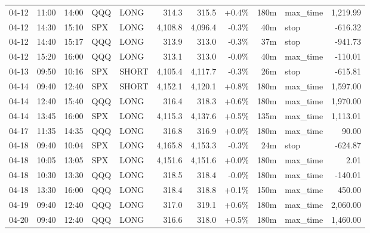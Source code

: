 \documentclass[11pt,a4paper,twoside]{article}
\begin{document}
\begin{center}
\begin{longtable}{>{\color{txtmain}}l l l l l r r r r >{\color{txtmain}}l r}
04-12 & 11:00 & 14:00 & QQQ & LONG & 314.3 & 315.5 & \textcolor{wingreen}{+0.4\%} & 180m & max\_time & \textcolor{wingreen}{1,219.99} \\
04-12 & 14:30 & 15:10 & SPX & LONG & 4,108.8 & 4,096.4 & \textcolor{lossred}{-0.3\%} & 40m & stop & \textcolor{lossred}{-616.32} \\
04-12 & 14:40 & 15:17 & QQQ & LONG & 313.9 & 313.0 & \textcolor{lossred}{-0.3\%} & 37m & stop & \textcolor{lossred}{-941.73} \\
04-12 & 15:20 & 16:00 & QQQ & LONG & 313.1 & 313.0 & \textcolor{lossred}{-0.0\%} & 40m & max\_time & \textcolor{lossred}{-110.01} \\
04-13 & 09:50 & 10:16 & SPX & SHORT & 4,105.4 & 4,117.7 & \textcolor{lossred}{-0.3\%} & 26m & stop & \textcolor{lossred}{-615.81} \\
04-14 & 09:40 & 12:40 & SPX & SHORT & 4,152.1 & 4,120.1 & \textcolor{wingreen}{+0.8\%} & 180m & max\_time & \textcolor{wingreen}{1,597.00} \\
04-14 & 12:40 & 15:40 & QQQ & LONG & 316.4 & 318.3 & \textcolor{wingreen}{+0.6\%} & 180m & max\_time & \textcolor{wingreen}{1,970.00} \\
04-14 & 13:45 & 16:00 & SPX & LONG & 4,115.3 & 4,137.6 & \textcolor{wingreen}{+0.5\%} & 135m & max\_time & \textcolor{wingreen}{1,113.01} \\
04-17 & 11:35 & 14:35 & QQQ & LONG & 316.8 & 316.9 & \textcolor{wingreen}{+0.0\%} & 180m & max\_time & \textcolor{wingreen}{90.00} \\
04-18 & 09:40 & 10:04 & SPX & LONG & 4,165.8 & 4,153.3 & \textcolor{lossred}{-0.3\%} & 24m & stop & \textcolor{lossred}{-624.87} \\
04-18 & 10:05 & 13:05 & SPX & LONG & 4,151.6 & 4,151.6 & \textcolor{wingreen}{+0.0\%} & 180m & max\_time & \textcolor{wingreen}{2.01} \\
04-18 & 10:30 & 13:30 & QQQ & LONG & 318.5 & 318.4 & \textcolor{lossred}{-0.0\%} & 180m & max\_time & \textcolor{lossred}{-140.01} \\
04-18 & 13:30 & 16:00 & QQQ & LONG & 318.4 & 318.8 & \textcolor{wingreen}{+0.1\%} & 150m & max\_time & \textcolor{wingreen}{450.00} \\
04-19 & 09:40 & 12:40 & QQQ & LONG & 317.0 & 319.1 & \textcolor{wingreen}{+0.6\%} & 180m & max\_time & \textcolor{wingreen}{2,060.00} \\
04-20 & 09:40 & 12:40 & QQQ & LONG & 316.6 & 318.0 & \textcolor{wingreen}{+0.5\%} & 180m & max\_time & \textcolor{wingreen}{1,460.00} \\

\end{longtable}
\end{center}
\end{document}
